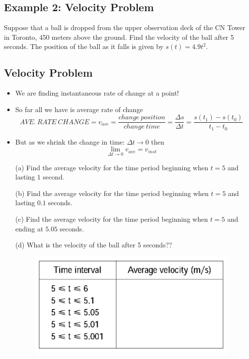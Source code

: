 \documentclass[10pt]{book}
\theoremstyle{definition}
\begin{document}
\subsection*{Example 2: Velocity Problem}
Suppose that a ball is dropped from the upper observation deck of the CN Tower in Toronto, 450 meters above the ground. Find the velocity of the ball after 5 seconds. The position of the ball as it falls is given by $s(t)=4.9t^2$.\\
\begin{tcolorbox}
\subsection*{Velocity Problem}
\begin{itemize}
    \item We are finding instantaneous rate of change at a point!
    \item So far all we have is average rate of change
    \[
    AVE.\ RATE\ CHANGE = v_{ave}=\frac{change\ position}{change\ time}=\frac{\Delta s}{\Delta t}=\frac{s(t_1)-s(t_0)}{t_1-t_0}
    \]
    \item But as we shrink the change in time: $\Delta t\rightarrow 0 $ then
    \[
    \lim_{\Delta t\rightarrow 0 }v_{ave}=v_{inst}
    \]
\end{itemize}
\end{tcolorbox}
\begin{enumerate}
    \item[(a)] Find the average velocity for the time period beginning when $t=5$ and lasting $1$ second.\vspace{2cm}
    \item[(b)]Find the average velocity for the time period beginning when $t=5$ and lasting $0.1$ seconds.\vspace{2cm}
    \item[(c)] Find the average velocity for the time period beginning when $t=5$ and ending at $5.05$ seconds.\vspace{2cm}
    \item[(d)] What is the velocity of the ball after 5 seconds??
    \begin{figure}[h!]
        \centering
        \includegraphics[scale=0.5]{fig3.png}
    \end{figure}
\end{enumerate}
\clearpage
\end{document}
